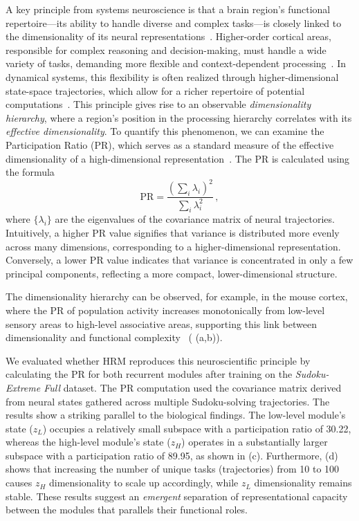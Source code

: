 A key principle from systems neuroscience is that a brain region's functional repertoire—its ability to handle diverse and complex tasks—is closely linked to the dimensionality of its neural representations~\citep{rigotti2013importance, mante2013context}. Higher-order cortical areas, responsible for complex reasoning and decision-making, must handle a wide variety of tasks, demanding more flexible and context-dependent processing~\citep{miller2001integrative}. In dynamical systems, this flexibility is often realized through higher-dimensional state-space trajectories, which allow for a richer repertoire of potential computations~\citep{maass2002realtime}. This principle gives rise to an observable \emph{dimensionality hierarchy}, where a region's position in the processing hierarchy correlates with its \emph{effective dimensionality}. To quantify this phenomenon, we can examine the Participation Ratio (PR), which serves as a standard measure of the effective dimensionality of a high-dimensional representation~\citep{altan2021estimating}. The PR is calculated using the formula 
\begin{equation*}
    \text{PR} = \frac{(\sum_{i} \lambda_i)^2}{\sum_{i} \lambda_i^2} \,,
\end{equation*}
where $\{\lambda_i\}$ are the eigenvalues of the covariance matrix of neural trajectories.
Intuitively, a higher PR value signifies that variance is distributed more evenly across many dimensions, corresponding to a higher-dimensional representation. Conversely, a lower PR value indicates that variance is concentrated in only a few principal components, reflecting a more compact, lower-dimensional structure.

The dimensionality hierarchy can be observed, for example, in the mouse cortex, where the PR of population activity increases monotonically from low-level sensory areas to high-level associative areas, supporting this link between dimensionality and functional complexity~\citep{posani2025rarely} ( (a,b)).

We evaluated whether HRM reproduces this neuroscientific principle by calculating the PR for both recurrent modules after training on the \textit{Sudoku-Extreme Full} dataset. The PR computation used the covariance matrix derived from neural states gathered across multiple Sudoku-solving trajectories. The results show a striking parallel to the biological findings. The low-level module's state ($z_L$) occupies a relatively small subspace with a participation ratio of 30.22, whereas the high-level module's state ($z_H$) operates in a substantially larger subspace with a participation ratio of 89.95, as shown in (c).
Furthermore, (d) shows that increasing the number of unique tasks (trajectories) from 10 to 100 causes $z_H$ dimensionality to scale up accordingly, while $z_L$ dimensionality remains stable. These results suggest an \emph{emergent} separation of representational capacity between the modules that parallels their functional roles.


